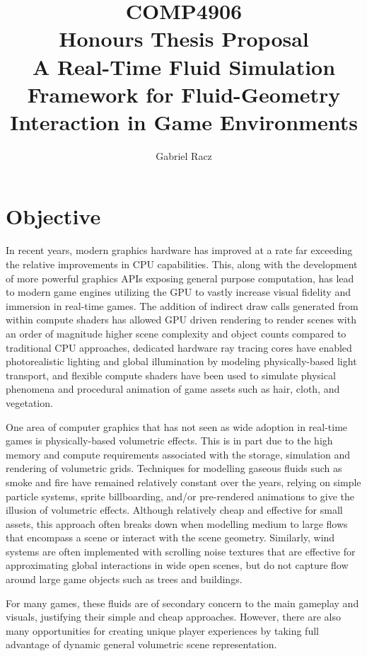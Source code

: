 \documentclass[a4paper, 11pt, titlepage]{article}
\title{COMP4906\\
Honours Thesis Proposal\\
A Real-Time Fluid Simulation Framework for Fluid-Geometry Interaction in Game Environments}
\author{Gabriel Racz}
\begin{document}
\maketitle

\section{Objective}
In recent years, modern graphics hardware has improved at a rate far exceeding
the relative improvements in CPU capabilities. This, along with the development
of more powerful graphics APIs exposing general purpose computation, has lead to
modern game engines utilizing the GPU to vastly increase visual fidelity and
immersion in real-time games. The addition of indirect draw calls generated from within
compute shaders has allowed GPU driven rendering to render scenes with an
order of magnitude higher scene complexity and object counts compared to
traditional CPU approaches, dedicated hardware ray tracing cores have enabled
photorealistic lighting and global illumination by modeling physically-based
light transport, and flexible compute shaders have been used to simulate
physical phenomena and procedural animation of game assets such as hair, cloth,
and vegetation.

One area of computer graphics that has not seen as wide adoption in
real-time games is physically-based volumetric effects. This is in part due to
the high memory and compute requirements associated with the storage, simulation
and rendering of volumetric grids. Techniques for modelling gaseous fluids
such as smoke and fire have remained relatively constant over the years, relying
on simple particle systems, sprite billboarding, and/or pre-rendered animations to give the illusion of
volumetric effects. Although relatively cheap and effective for small
assets, this approach often breaks down when modelling medium to large flows
that encompass a scene or interact with the scene geometry. Similarly, wind
systems are often implemented with scrolling noise textures that are effective
for approximating global interactions in wide open scenes, but do not capture
flow around large game objects such as trees and buildings.

For many games, these fluids are of secondary concern to the main gameplay and
visuals, justifying their simple and cheap approaches. However, there are also
many opportunities for creating unique player experiences by taking full
advantage of dynamic general volumetric scene representation.
\end{document}
